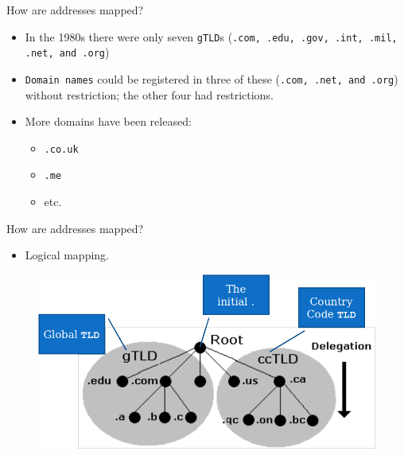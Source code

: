\documentclass[xcolor=table]{beamer}
\begin{document}
\begin{frame}{How are addresses mapped?}
  \begin{itemize}
    \item In the 1980s there were only seven \texttt{gTLD}s (\texttt{.com, .edu, .gov, .int, .mil, .net, and .org}) 
    \item \texttt{Domain names} could be registered in three of these (\texttt{.com, .net, and .org}) without restriction; the other four had restrictions.
    \item More domains have been released:
      \begin{itemize}
        \item \texttt{.co.uk}
        \item \texttt{.me}
        \item etc.
      \end{itemize}
  \end{itemize}
\end{frame}

\begin{frame}{How are addresses mapped?}
  \begin{itemize}
    \item Logical mapping. 
  \end{itemize}
  \begin{figure}
    \begin{center}
      \includegraphics[width=1\linewidth]{DNS.png}
    \end{center}
  \end{figure}
\end{frame}
\end{document}
